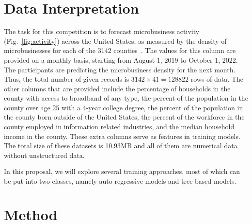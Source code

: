 \documentclass[prl,aps,superscriptaddress,twocolumn,10pt,nolongbibliography]{revtex4-2}
\begin{document}
\section{Data Interpretation}
The task for this competition is to forecast microbusiness activity (Fig.~\ref{fig:activity}) across the United States, as measured by the density of microbusinesses for each of the 3142 counties~\cite{yu2021godaddy}.
The values for this column are provided on a monthly basis, starting from August 1, 2019 to October 1, 2022. 
The participants are predicting the microbusiness density for the next month. 
Thus, the total number of given records is $3142 \times 41 = 128822$ rows of data.
The other columns that are provided include the percentage of households in the county with access to broadband of any type, the percent of the population in the county over age 25 with a 4-year college degree, the percent of the population in the county born outside of the United States, the percent of the workforce in the county employed in information related industries, and the median household income in the county. 
These extra columns serve as features in training models.
The total size of these datasets is 10.93MB and all of them are numerical data without unstructured data. 

In this proposal, we will explore several training approaches, most of which can be put into two classes, namely auto-regressive models and tree-based models. 

\section{Method}
\end{document}
